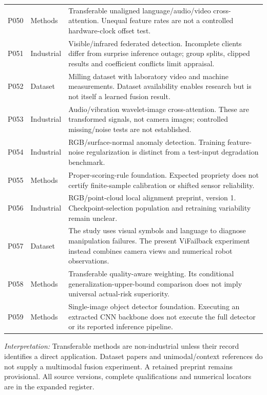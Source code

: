 \begin{longtable}{@{}P{.25\textwidth}P{.16\textwidth}P{.53\textwidth}@{}}
P050 \citep{P050} & Methods & Transferable unaligned language/audio/video
cross-attention. Unequal feature rates are not a controlled hardware-clock offset test.
\\
P051 \citep{P051} & Industrial & Visible/infrared federated detection. Incomplete
clients differ from surprise inference outage; group splits, clipped results and
coefficient conflicts limit appraisal. \\
P052 \citep{Kim2026MSM} & Dataset & Milling dataset with laboratory video and machine
measurements. Dataset availability enables research but is not itself a learned fusion
result. \\
P053 \citep{P053} & Industrial & Audio/vibration wavelet-image cross-attention. These
are transformed signals, not camera images; controlled missing/noise tests are not
established. \\
P054 \citep{P054} & Industrial & RGB/surface-normal anomaly detection. Training
feature-noise regularization is distinct from a test-input degradation benchmark. \\
P055 \citep{P055} & Methods & Proper-scoring-rule foundation. Expected propriety does
not certify finite-sample calibration or shifted sensor reliability. \\
P056 \citep{P056} & Industrial & RGB/point-cloud local alignment preprint, version 1.
Checkpoint-selection population and retraining variability remain unclear. \\
P057 \citep{Zeng2026ViFailback} & Dataset & The study uses visual symbols and language
to diagnose manipulation failures. The present ViFailback experiment instead combines
camera views and numerical robot observations. \\
P058 \citep{Zhang2023QMF} & Methods & Transferable quality-aware weighting. Its
conditional generalization-upper-bound comparison does not imply universal actual-risk
superiority. \\
P059 \citep{Zhao2024RTDETR} & Methods & Single-image object detector foundation.
Executing an extracted CNN backbone does not execute the full detector or its reported
inference pipeline. \\
\bottomrule\end{longtable}
\endgroup
\noindent\textit{Interpretation:} Transferable methods are non-industrial unless their
record identifies a direct application. Dataset papers and unimodal/context references
do not supply a multimodal fusion experiment. A retained preprint remains provisional.
All source versions, complete qualifications and numerical locators are in the expanded
register.

